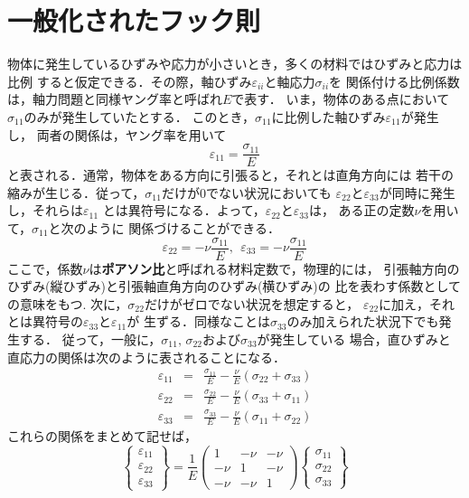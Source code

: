 \documentclass[10pt,a4j]{jbook}
\begin{document}
\section{一般化されたフック則}
物体に発生しているひずみや応力が小さいとき，多くの材料ではひずみと応力は比例
すると仮定できる．その際，軸ひずみ$\varepsilon_{ii}$と軸応力$\sigma_{ii}$を
関係付ける比例係数は，軸力問題と同様ヤング率と呼ばれ$E$で表す．
いま，物体のある点において$\sigma_{11}$のみが発生していたとする．
このとき，$\sigma_{11}$に比例した軸ひずみ$\varepsilon_{11}$が発生し，
両者の関係は，ヤング率を用いて
\begin{equation}
	\varepsilon_{11}=\frac{\sigma_{11}}{E}
\end{equation}
と表される．通常，物体をある方向に引張ると，それとは直角方向には
若干の縮みが生じる．従って，$\sigma_{11}$だけが0でない状況においても
$\varepsilon_{22}$と$\varepsilon_{33}$が同時に発生し，それらは$\varepsilon_{11}$
とは異符号になる．よって，$\varepsilon_{22}$と$\varepsilon_{33}$は，
ある正の定数$\nu$を用いて，$\sigma_{11}$と次のように
関係づけることができる．
\begin{equation}
	\varepsilon_{22}=-\nu \frac{\sigma_{11}}{E}, \ \
	\varepsilon_{33}=-\nu \frac{\sigma_{11}}{E}
\end{equation}
ここで，係数$\nu$は{\bf ポアソン比}と呼ばれる材料定数で，物理的には，
引張軸方向のひずみ(縦ひずみ)と引張軸直角方向のひずみ(横ひずみ)の
比を表わす係数としての意味をもつ. 次に，$\sigma_{22}$だけがゼロでない状況を想定すると，
$\varepsilon_{22}$に加え，それとは異符号の$\varepsilon_{33}$と$\varepsilon_{11}$が
生ずる．同様なことは$\sigma_{33}$のみ加えられた状況下でも発生する．
従って，一般に，$\sigma_{11},\,\sigma_{22}$および$\sigma_{33}$が発生している
場合，直ひずみと直応力の関係は次のように表されることになる．
\begin{eqnarray}
	\varepsilon_{11} &=& \frac{\sigma_{11}}{E}-\frac{\nu}{E}\left( \sigma_{22}+\sigma_{33} \right) \\
	\varepsilon_{22} &=& \frac{\sigma_{22}}{E}-\frac{\nu}{E}\left( \sigma_{33}+\sigma_{11} \right) \\
	\varepsilon_{33} &=& \frac{\sigma_{33}}{E}-\frac{\nu}{E}\left( \sigma_{11}+\sigma_{22} \right)
	\label{eqn:eii_sjj}
\end{eqnarray}
これらの関係をまとめて記せば，
\begin{equation}
	\left\{ 
	\begin{array}{*{20}{c}}
	\varepsilon _{11}\\
	\varepsilon _{22}\\
	\varepsilon _{33}
	\end{array}
	\right\} 
	= 
	\frac{1}{E}\left( 
	\begin{array}{*{20}{c}}
	1& - \nu & - \nu \\
	 - \nu &1& - \nu \\
	 - \nu & - \nu &1
	\end{array}
	\right)
	\left\{ 
	\begin{array}{*{20}{c}}
	\sigma _{11}\\
	\sigma _{22}\\
	\sigma _{33}
	\end{array} 
	\right\}
	\label{eqn:eii_sjj_mat}
\end{equation}
\end{document}
